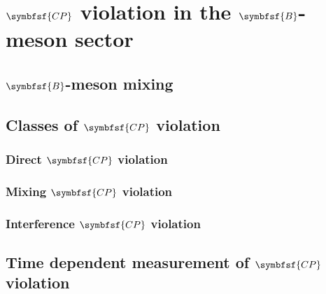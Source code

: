\chapter[head={$C{}P$ violation in the $B$-meson sector},tocentry={$\symbfsf{C{}P}$ violation in the $\symbfsf{B}$-meson sector}]
{$\symbfsf{C{}P}$ violation in the $\symbfsf{B}$-meson sector}


\section[head={$B$-meson mixing},tocentry={$B$-meson mixing}]{$\symbfsf{B}$-meson mixing}


\section[head={Classes of $C{}P$ violation},tocentry={Classes of $C{}P$ violation}]{Classes of $\symbfsf{C{}P}$ violation}


\subsection[head={Direct $C{}P$ violation},tocentry={Direct $C{}P$ violation}]{Direct $\symbfsf{C{}P}$ violation}


\subsection[head={Mixing $C{}P$ violation},tocentry={Mixing $C{}P$ violation}]{Mixing $\symbfsf{C{}P}$ violation}


\subsection[head={Interference $C{}P$ violation},tocentry={Interference $C{}P$ violation}]{Interference $\symbfsf{C{}P}$ violation}


\section[head={Time dependent measurement of $C{}P$ violation},tocentry={Time dependent measurement of $C{}P$ violation}]
{Time dependent measurement of $\symbfsf{C{}P}$ violation}

